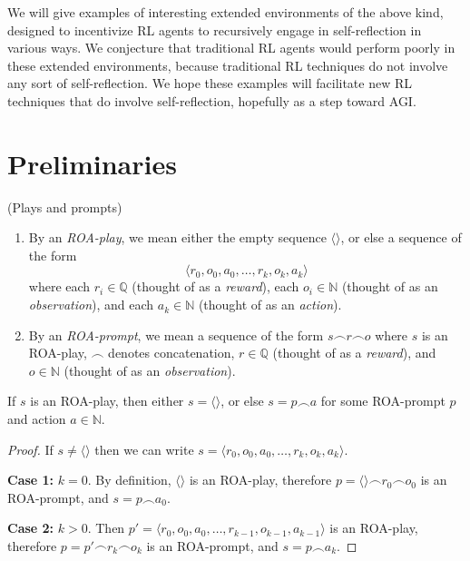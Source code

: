 \documentclass[runningheads]{llncs}
\begin{document}
We will give examples of interesting
extended environments of the above kind, designed to incentivize RL agents to
recursively engage in self-reflection in various ways.
We conjecture that traditional RL agents would perform poorly in these extended
environments, because traditional RL techniques do not involve any sort of
self-reflection. We hope these examples will facilitate
new RL techniques that do involve self-reflection, hopefully as a step toward AGI.

\section{Preliminaries}

\begin{definition}
(Plays and prompts)
    \begin{enumerate}
        \item
        By an \emph{ROA-play}, we mean either the empty sequence $\langle\rangle$,
        or else a sequence of the form
        \[
            \langle r_0,o_0,a_0,\ldots,r_k,o_k,a_k\rangle
        \]
        where each $r_i\in\mathbb Q$ (thought of as a \emph{reward}),
        each $o_i\in\mathbb N$ (thought of as an \emph{observation}),
        and each $a_k\in \mathbb N$ (thought of as an \emph{action}).
        \item
        By an \emph{ROA-prompt}, we mean a sequence of the form
        $s\frown r\frown o$
        where $s$ is an ROA-play, $\frown$ denotes concatenation,
        $r\in\mathbb Q$ (thought of as a \emph{reward}),
        and $o\in\mathbb N$ (thought of as an \emph{observation}).
    \end{enumerate}
\end{definition}

\begin{lemma}
\label{roaplaydecompositionlemma}
    If $s$ is an ROA-play, then either $s=\langle\rangle$, or else
    $s=p\frown a$ for some ROA-prompt $p$ and action $a\in\mathbb N$.
\end{lemma}

\begin{proof}
    If $s\not=\langle\rangle$ then we can write
    $s=\langle r_0,o_0,a_0,\ldots,r_k,o_k,a_k \rangle$.

    \textbf{Case 1:}
    $k=0$. By definition, $\langle\rangle$ is an ROA-play,
    therefore $p=\langle\rangle\frown r_0\frown o_0$ is an ROA-prompt,
    and $s=p\frown a_0$.

    \textbf{Case 2:} $k>0$.
    Then $p'=\langle r_0,o_0,a_0,\ldots,r_{k-1},o_{k-1},a_{k-1}\rangle$ is an ROA-play,
    therefore $p=p'\frown r_k\frown o_k$ is an ROA-prompt,
    and $s=p\frown a_k$.
\end{proof}
\end{document}
